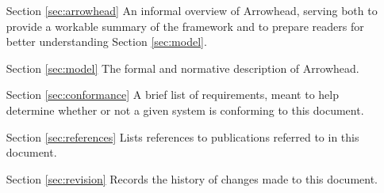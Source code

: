\begin{itemize}[leftmargin=3cm,rightmargin=0pt,labelwidth=2cm,labelsep=0pt,itemindent=0pt,parsep=0.25cm,topsep=0.25cm,align=left]


\item[Section \ref{sec:arrowhead}]
An informal overview of Arrowhead, serving both to provide a workable summary of the framework and to prepare readers for better understanding Section \ref{sec:model}.

\item[Section \ref{sec:model}]
The formal and normative description of Arrowhead.

\item[Section \ref{sec:conformance}]
A brief list of requirements, meant to help determine whether or not a given system is conforming to this document.

\item[Section \ref{sec:references}]
Lists references to publications referred to in this document.

\item[Section \ref{sec:revision}]
Records the history of changes made to this document.

\end{itemize}
